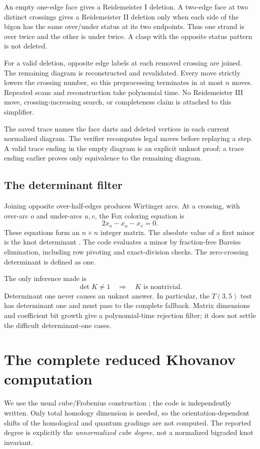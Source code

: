 \documentclass[11pt]{article}
\theoremstyle{definition}
\begin{document}
An empty one-edge face gives a Reidemeister I deletion. A two-edge face at two
distinct crossings gives a Reidemeister II deletion only when each side of the
bigon has the same over/under status at its two endpoints. Thus one strand is
over twice and the other is under twice. A clasp with the opposite status
pattern is not deleted.

For a valid deletion, opposite edge labels at each removed crossing are joined.
The remaining diagram is reconstructed and revalidated. Every move strictly
lowers the crossing number, so this preprocessing terminates in at most $n$
moves. Repeated scans and reconstruction take polynomial time. No Reidemeister
III move, crossing-increasing search, or completeness claim is attached to this
simplifier.

The saved trace names the face darts and deleted vertices in each current
normalized diagram. The verifier recomputes legal moves before replaying a
step. A valid trace ending in the empty diagram is an explicit unknot proof;
a trace ending earlier proves only equivalence to the remaining diagram.

\subsection{The determinant filter}

Joining opposite over-half-edges produces Wirtinger arcs. At a crossing, with
over-arc $o$ and under-arcs $u,v$, the Fox coloring equation is
\[
 2x_o-x_u-x_v=0.
\]
These equations form an $n\times n$ integer matrix. The absolute value of a
first minor is the knot determinant \cite{coloring}. The code evaluates a minor
by fraction-free Bareiss elimination, including row pivoting and exact-division
checks. The zero-crossing determinant is defined as one.

The only inference made is
\[
 \det K\ne1\quad\Longrightarrow\quad K\text{ is nontrivial}.
\]
Determinant one never causes an unknot answer. In particular, the $T(3,5)$ test
has determinant one and must pass to the complete fallback. Matrix dimensions
and coefficient bit growth give a polynomial-time rejection filter; it does
not settle the difficult determinant-one cases.

\section{The complete reduced Khovanov computation}

We use the usual cube/Frobenius construction \cite{khovanov,barnatan}; the code
is independently written. Only total homology dimension is needed, so the
orientation-dependent shifts of the homological and quantum gradings are not
computed. The reported degree is explicitly the \emph{unnormalized cube degree},
not a normalized bigraded knot invariant.
\end{document}
